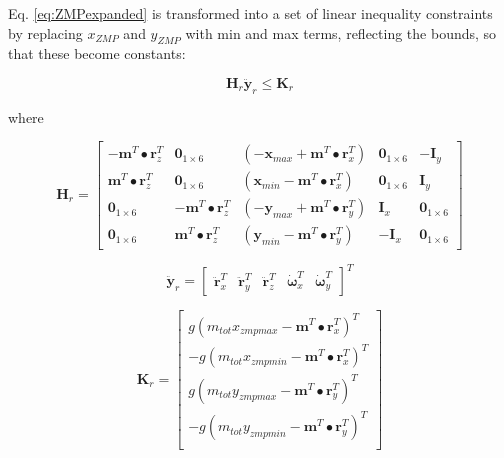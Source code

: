 \documentclass{llncs}
\begin{document}
Eq. \ref{eq:ZMPexpanded} is transformed into a set of linear inequality constraints by replacing $x_{ZMP}$ and $y_{ZMP}$ with min and max terms, reflecting 
the bounds, so that these become constants:

\begin{equation}
\mathbf{H}_r \ddot{\mathbf{y}}_r \leq \mathbf{K}_r
\label{eq:LinearInequality}
\end{equation}

\noindent where

\begin{equation}
\mathbf{H}_r = 
\begin{bmatrix}
- \mathbf{m}^T \bullet \mathbf{r}_z^T & \mathbf{0}_{1 \times 6} & \left( -\mathbf{x}_{max} + \mathbf{m}^T \bullet \mathbf{r}_x^T \right) & \mathbf{0}_{1 \times 6} & - \mathbf{I}_y \\
\mathbf{m}^T \bullet \mathbf{r}_z^T & \mathbf{0}_{1 \times 6} & \left( \mathbf{x}_{min} - \mathbf{m}^T \bullet \mathbf{r}_x^T \right) & \mathbf{0}_{1 \times 6} & \mathbf{I}_y \\
\mathbf{0}_{1 \times 6} & - \mathbf{m}^T \bullet \mathbf{r}_z^T & \left( -\mathbf{y}_{max} + \mathbf{m}^T \bullet \mathbf{r}_y^T \right) & \mathbf{I}_x & \mathbf{0}_{1 \times 6} \\
\mathbf{0}_{1 \times 6} & \mathbf{m}^T \bullet \mathbf{r}_z^T & \left( \mathbf{y}_{min} - \mathbf{m}^T \bullet \mathbf{r}_y^T \right) & - \mathbf{I}_x & \mathbf{0}_{1 \times 6}
\end{bmatrix}
\label{eq:Hr_def}
\end{equation}

\begin{equation}
\ddot{\mathbf{y}}_r = 
\begin{bmatrix}
\ddot{\mathbf{r}}_x^T & \ddot{\mathbf{r}}_y^T & \ddot{\mathbf{r}}_z^T & \dot{\mathbf{\omega}}_x^T & \dot{\mathbf{\omega}}_y^T
\end{bmatrix}^T
\label{eq:yr_def}
\end{equation}

\begin{equation}
\mathbf{K}_r = 
\begin{bmatrix}
g \left( m_{tot} x_{zmpmax} - \mathbf{m}^T \bullet \mathbf{r}_x^T \right)^T \\
-g \left( m_{tot} x_{zmpmin} - \mathbf{m}^T \bullet \mathbf{r}_x^T \right)^T \\
g \left( m_{tot} y_{zmpmax} - \mathbf{m}^T \bullet \mathbf{r}_y^T \right)^T \\
-g \left( m_{tot} y_{zmpmin} - \mathbf{m}^T \bullet \mathbf{r}_y^T \right)^T \\
\end{bmatrix}
\label{eq:Kr_def}
\end{equation}
\end{document}
